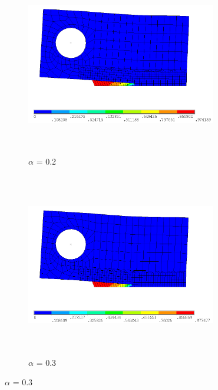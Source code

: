 \documentclass[a4paper,12pt,twoside]{report}
\begin{document}
\begin{figure}[htbp!]
       \captionsetup[subfigure]{justification=centering}
     \begin{subfigure}{0.4\textwidth}
        \centering
         \includegraphics[width=8.3cm,height=8cm,keepaspectratio]{26.d2_a_0.2.png}
         \centering
         \caption{$\alpha$ = 0.2}
         \label{fig:d2-a_0.2}
     \end{subfigure}
    \hspace{1.8cm}
     \captionsetup[subfigure]{justification=centering}
     \begin{subfigure}{0.4\textwidth}
         \centering
         \includegraphics[width=8.3cm,height=8cm,keepaspectratio]{26.d2_a_0.3.png}
         \centering
         \caption{$\alpha$ = 0.3}
         \label{fig:d2-a_0.3}
     \end{subfigure}
\end{figure}
\FloatBarrier
\end{document}
